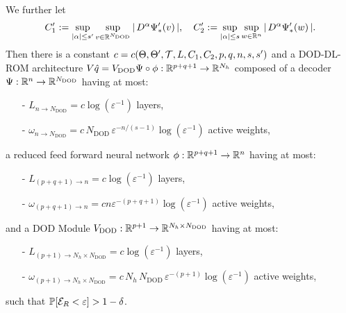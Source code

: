 \begin{theorem}
\begin{equation*}
    \end{equation*}
    We further let 
    \begin{equation*}
        C'_1 := \sup\limits_{\vert \alpha \vert \leq s'} \sup\limits_{v \in \mathbb{R}^{N_{\text{DOD}}}} \vert \, D^\alpha \Psi_*'(v) \, \vert, \quad 
        C'_2 := \sup\limits_{\vert \alpha \vert \leq s} \sup\limits_{w \in \mathbb{R}^n} \vert \, D^\alpha \Psi_*'(w) \, \vert.
    \end{equation*}
    Then there is a constant $c = c(\Theta, \Theta', \mathcal{T}, L, C_1, C_2, p, q, n, s, s')$ and a DOD-DL-ROM architecture $V \hat{q} =
    V_{\text{DOD}} \Psi \circ \phi: \mathbb{R}^{p+q+1} \to \mathbb{R}^{N_h}$ composed of a decoder $\Psi: \mathbb{R}^n \to \mathbb{R}^{N_{\text{DOD}}}$ having at most:
    \begin{enumerate}
        \item[-] $L_{n \to N_{\text{DOD}}} = c \log(\varepsilon^{-1})$ layers,
        \item[-] $\omega_{n \to N_{\text{DOD}}} = c \,  N_{\text{DOD}} \, \varepsilon^{-n/(s-1)} \log(\varepsilon^{-1})$ active weights,
    \end{enumerate}
    a reduced feed forward neural network $\phi: \mathbb{R}^{p+q+1} \to \mathbb{R}^n$ having at most:
    \begin{enumerate}
        \item[-] $L_{(p+q+1) \to n} = c \log(\varepsilon^{-1})$ layers,
        \item[-] $\omega_{(p+q+1) \to n} = cn \varepsilon^{-(p+q+1)} \log(\varepsilon^{-1})$ active weights,
    \end{enumerate}
    and a DOD Module $V_{\text{DOD}}: \mathbb{R}^{p+1} \to \mathbb{R}^{N_h \times N_{\text{DOD}}}$ having at most:
    \begin{enumerate}
        \item[-] $L_{(p+1) \to N_h \times N_{\text{DOD}}} = c \log(\varepsilon^{-1})$ layers,
        \item[-] $\omega_{(p+1) \to N_h \times N_{\text{DOD}}} = c \, N_h \, N_{\text{DOD}} \, \varepsilon^{-(p+1)} \log(\varepsilon^{-1})$ active weights, 
    \end{enumerate}
    such that $\mathbb{P}[\mathcal{E}_R < \varepsilon] > 1 - \delta$.
\end{theorem}
